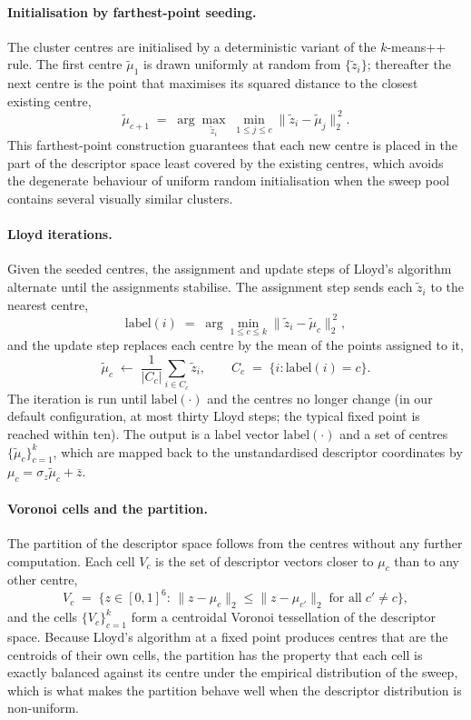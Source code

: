\paragraph{Initialisation by farthest-point seeding.}
The cluster centres are initialised by a deterministic variant of the $k$-means++ rule. The first centre $\tilde \mu_1$ is drawn uniformly at random from $\{\tilde z_i\}$; thereafter the next centre is the point that maximises its squared distance to the closest existing centre,
\[
\tilde \mu_{c+1} \;=\; \arg\max_{\tilde z_i} \;\min_{1 \le j \le c} \|\tilde z_i - \tilde \mu_j\|_2^{\,2}.
\]
This farthest-point construction guarantees that each new centre is placed in the part of the descriptor space least covered by the existing centres, which avoids the degenerate behaviour of uniform random initialisation when the sweep pool contains several visually similar clusters.

\paragraph{Lloyd iterations.}
Given the seeded centres, the assignment and update steps of Lloyd's algorithm alternate until the assignments stabilise. The assignment step sends each $\tilde z_i$ to the nearest centre,
\[
\mathrm{label}(i) \;=\; \arg\min_{1 \le c \le k} \|\tilde z_i - \tilde \mu_c\|_2^{\,2},
\]
and the update step replaces each centre by the mean of the points assigned to it,
\[
\tilde \mu_c \;\leftarrow\; \frac{1}{|C_c|} \sum_{i \in C_c} \tilde z_i, \qquad C_c \;=\; \{i : \mathrm{label}(i) = c\}.
\]
The iteration is run until $\mathrm{label}(\cdot)$ and the centres no longer change (in our default configuration, at most thirty Lloyd steps; the typical fixed point is reached within ten). The output is a label vector $\mathrm{label}(\cdot)$ and a set of centres $\{\tilde \mu_c\}_{c=1}^{k}$, which are mapped back to the unstandardised descriptor coordinates by $\mu_c = \sigma_z \tilde \mu_c + \bar z$.

\paragraph{Voronoi cells and the partition.}
The partition of the descriptor space follows from the centres without any further computation. Each cell $V_c$ is the set of descriptor vectors closer to $\mu_c$ than to any other centre,
\[
V_c \;=\; \big\{z \in [0,1]^6 :\, \|z - \mu_c\|_2 \le \|z - \mu_{c'}\|_2 \;\text{for all}\; c' \neq c\big\},
\]
and the cells $\{V_c\}_{c=1}^{k}$ form a centroidal Voronoi tessellation of the descriptor space. Because Lloyd's algorithm at a fixed point produces centres that are the centroids of their own cells, the partition has the property that each cell is exactly balanced against its centre under the empirical distribution of the sweep, which is what makes the partition behave well when the descriptor distribution is non-uniform.

